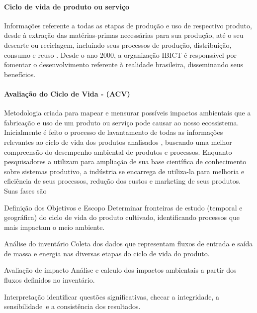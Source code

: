 \paragraph{Ciclo de vida de produto ou serviço}
 Informações referente a todas as etapas de produção e uso de respectivo produto, desde à extração das matérias-primas necessárias para sua produção, até o seu descarte ou reciclagem, incluíndo seus processos de produção, distribuição, consumo e reuso \cite{IBICT}.  Desde o ano 2000, a organização IBICT é responsável por fomentar o desenvolvimento referente à realidade brasileira, disseminando seus benefícios.


\paragraph{Avaliação do Ciclo de Vida - (ACV)}
Metodologia criada para mapear e mensurar possíveis impactos ambientais que a fabricação e uso de um produto ou serviço pode causar ao nosso ecossistema. Inicialmente é feito o processo de lavantamento de todas as informações relevantes ao ciclo de vida dos produtos analisados \cite{IBICT}, buscando uma melhor compreensão do desempenho ambiental de produtos e processos. Enquanto pesquisadores a utilizam para ampliação de sua base científica de conhecimento sobre sistemas produtivo, a indústria se encarrega de utiliza-la para melhoria e eficiência de seus processos, redução dos custos e marketing de seus produtos. Suas fases são


\begin{labeling}
\item[Definição dos Objetivos e Escopo] Determinar fronteiras de estudo (temporal e geográfica) do ciclo de vida do produto cultivado, identificando processos que mais impactam o meio ambiente. 
\item[Análise do inventário] Coleta dos dados que representam fluxos de entrada e saída de massa e energia nas diversas etapas do ciclo de vida do produto.
\item[Avaliação de impacto] Análise e calculo dos impactos ambientais a partir dos fluxos definidos no inventário.
\item[Interpretação] identificar questões significativas, checar a integridade, a sensibilidade e a consistência dos resultados.
\end{labeling}
